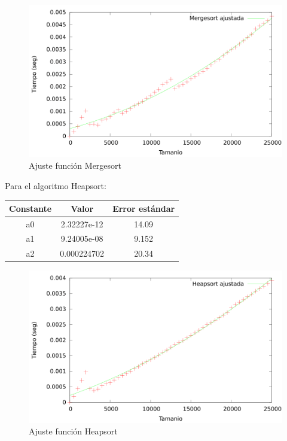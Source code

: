 \documentclass{article}
\begin{document}
	\begin{figure}[h]
		\centering
		\includegraphics[totalheight=8cm]{img/Mergesort_ajustada}
		\caption{Ajuste función Mergesort}
		\label{fig:Mergesort_ajustada}
	\end{figure}

	Para el algoritmo Heapsort:

	\begin{longtable}{|c|c|c|}
		\hline
		Constante		& Valor			& Error estándar	\\ \hline
		a0              & 2.32227e-12	& 14.09 \\ \hline
		a1              & 9.24005e-08	& 9.152 \\ \hline
		a2              & 0.000224702	& 20.34 \\ \hline
	\end{longtable}

	\begin{figure}[h]
		\centering
		\includegraphics[totalheight=8cm]{img/Heapsort_ajustada}
		\caption{Ajuste función Heapsort}
		\label{fig:Heapsort_ajustada}
	\end{figure}
\end{document}
